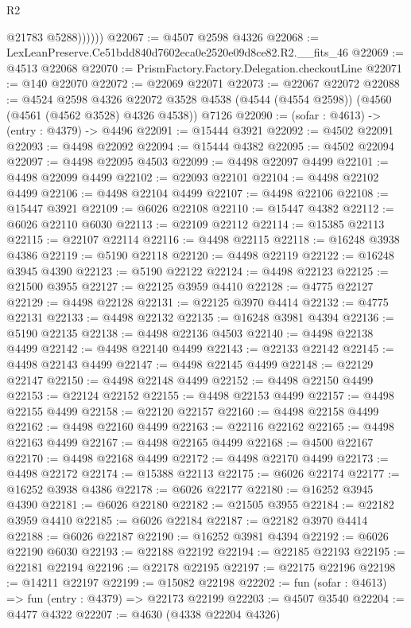 \begin{lexlean}{R2}
\begin{coremodule}
                @21783
                @5288))))))
@22067 := @4507 @2598 @4326
@22068 := LexLeanPreserve.Ce51bdd840d7602eca0e2520e09d8ce82.R2.__fits_46
@22069 := @4513 @22068
@22070 := PrismFactory.Factory.Delegation.checkoutLine
@22071 := @140 @22070
@22072 := @22069 @22071
@22073 := @22067 @22072
@22088 := @4524
    @2598
    @4326
    @22072
    @3528
    @4538
    (@4544 (@4554 @2598))
    (@4560 (@4561 (@4562 @3528) @4326 @4538))
    @7126
@22090 := (sofar : @4613) -> (entry : @4379) -> @4496
@22091 := @15444 @3921
@22092 := @4502 @22091
@22093 := @4498 @22092
@22094 := @15444 @4382
@22095 := @4502 @22094
@22097 := @4498 @22095 @4503
@22099 := @4498 @22097 @4499
@22101 := @4498 @22099 @4499
@22102 := @22093 @22101
@22104 := @4498 @22102 @4499
@22106 := @4498 @22104 @4499
@22107 := @4498 @22106
@22108 := @15447 @3921
@22109 := @6026 @22108
@22110 := @15447 @4382
@22112 := @6026 @22110 @6030
@22113 := @22109 @22112
@22114 := @15385 @22113
@22115 := @22107 @22114
@22116 := @4498 @22115
@22118 := @16248 @3938 @4386
@22119 := @5190 @22118
@22120 := @4498 @22119
@22122 := @16248 @3945 @4390
@22123 := @5190 @22122
@22124 := @4498 @22123
@22125 := @21500 @3955
@22127 := @22125 @3959 @4410
@22128 := @4775 @22127
@22129 := @4498 @22128
@22131 := @22125 @3970 @4414
@22132 := @4775 @22131
@22133 := @4498 @22132
@22135 := @16248 @3981 @4394
@22136 := @5190 @22135
@22138 := @4498 @22136 @4503
@22140 := @4498 @22138 @4499
@22142 := @4498 @22140 @4499
@22143 := @22133 @22142
@22145 := @4498 @22143 @4499
@22147 := @4498 @22145 @4499
@22148 := @22129 @22147
@22150 := @4498 @22148 @4499
@22152 := @4498 @22150 @4499
@22153 := @22124 @22152
@22155 := @4498 @22153 @4499
@22157 := @4498 @22155 @4499
@22158 := @22120 @22157
@22160 := @4498 @22158 @4499
@22162 := @4498 @22160 @4499
@22163 := @22116 @22162
@22165 := @4498 @22163 @4499
@22167 := @4498 @22165 @4499
@22168 := @4500 @22167
@22170 := @4498 @22168 @4499
@22172 := @4498 @22170 @4499
@22173 := @4498 @22172
@22174 := @15388 @22113
@22175 := @6026 @22174
@22177 := @16252 @3938 @4386
@22178 := @6026 @22177
@22180 := @16252 @3945 @4390
@22181 := @6026 @22180
@22182 := @21505 @3955
@22184 := @22182 @3959 @4410
@22185 := @6026 @22184
@22187 := @22182 @3970 @4414
@22188 := @6026 @22187
@22190 := @16252 @3981 @4394
@22192 := @6026 @22190 @6030
@22193 := @22188 @22192
@22194 := @22185 @22193
@22195 := @22181 @22194
@22196 := @22178 @22195
@22197 := @22175 @22196
@22198 := @14211 @22197
@22199 := @15082 @22198
@22202 := fun (sofar : @4613) => fun (entry : @4379) => @22173 @22199
@22203 := @4507 @3540
@22204 := @4477 @4322
@22207 := @4630 (@4338 @22204 @4326)

\end{coremodule}
\end{lexlean}
